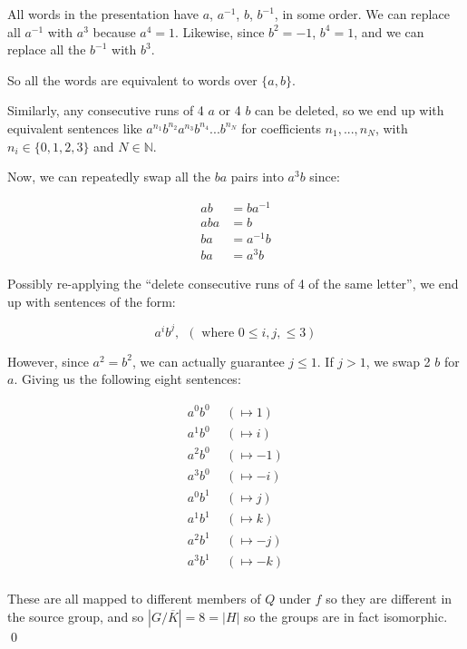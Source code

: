 \documentclass[11pt,oneside]{article}
\numberwithin{equation}{section}
\theoremstyle{definition}
\def\NN{\mathbb{N}}
\begin{document}
\begin{solution}
  All words in the presentation have $a$, $a^{-1}$, $b$, $b^{-1}$, in some order.
  We can replace all $a^{-1}$ with ${a^3}$ because $a^4 =1$.  Likewise, since $b^2 = -1$,
  $ b^4 =1$, and we can replace all the $b^{-1}$ with $b^3$.

  So all the words are equivalent to words over $\{a, b\}$.

  Similarly, any consecutive runs of 4 $a$ or 4 $b$ can be deleted, so we end up with equivalent
  sentences like $a^{n_1}b^{n_2}a^{n_3}b^{n_4} ... b^{n_N}$ for coefficients $n_1, ... , n_N$, with
  $n_i \in \{ 0, 1, 2 , 3\} $  and $N \in \NN$.

  Now, we can repeatedly swap all the $ba$ pairs into $a^3b$ since:

  \begin{align*}
    ab & = b a ^ {-1} \\
    aba & = b \\
    ba & = a ^ { -1 } b\\
    ba & = a ^ 3 b
  \end{align*}

  Possibly re-applying the ``delete consecutive runs of 4 of the same letter'', we end up with sentences of the form:

  \[
  a ^ i b ^ j, \ \ (\textrm{ where } 0 \leq i, j, \leq 3)
  \]

  However, since $a^2 = b^2$, we can actually guarantee $j \leq 1$.  If $j > 1$, we swap 2 $b$ for $a$.  Giving us
  the following eight sentences:

  \begin{align*}
    a^0 b^0 & \ \ ( \mapsto 1)\\
    a^1 b^0 & \ \ ( \mapsto i)\\
    a^2 b^0 & \ \ ( \mapsto -1)\\
    a^3 b^0 & \ \ ( \mapsto -i)\\
    a^0 b^1 & \ \ ( \mapsto j)\\
    a^1 b^1 & \ \ ( \mapsto k)\\
    a^2 b^1 & \ \ ( \mapsto -j)\\
    a^3 b^1 & \ \ ( \mapsto -k)\\
  \end{align*}

  These are all mapped to different members of $Q$ under $f$ so they are different in the source group, and
  so $|G / \overline K| = 8 = |H|$ so the groups are in fact isomorphic. \qed
  
\end{solution}
\end{document}
